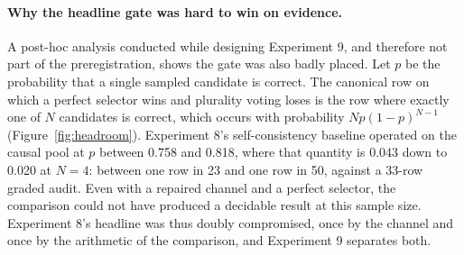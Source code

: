\documentclass[10pt,a4paper]{article}
\begin{document}
\paragraph{Why the headline gate was hard to win on evidence.}
A post-hoc analysis conducted while designing Experiment 9, and therefore not part
of the preregistration, shows the gate was also badly placed. Let $p$ be the
probability that a single sampled candidate is correct. The canonical row on
which a perfect selector wins and plurality voting loses is the row where
exactly one of $N$ candidates is correct, which occurs with probability
$N p (1-p)^{N-1}$ (Figure~\ref{fig:headroom}). Experiment 8's self-consistency
baseline operated on the causal pool at $p$ between 0.758 and 0.818, where
that quantity is 0.043 down to 0.020 at $N=4$: between one row in 23 and one
row in 50, against a 33-row graded audit. Even with a repaired channel and a
perfect selector, the comparison could not have produced a decidable result
at this sample size. Experiment 8's headline was thus doubly compromised, once by
the channel and once by the arithmetic of the comparison, and Experiment 9
separates both.
\end{document}
